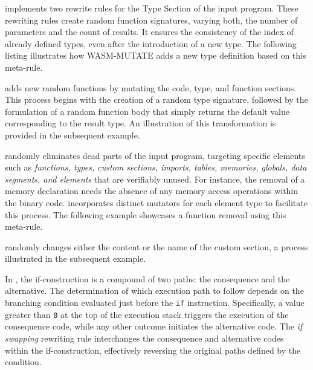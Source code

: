 \tool implements two rewrite rules for the Type Section of the input \Wasm program.
These rewriting rules create random function signatures, varying both, the number of parameters and the count of results. 
It ensures the consistency of the index of already defined types, even after the introduction of a new type.
The following listing illustrates how WASM-MUTATE adds a new type definition based on this meta-rule. 



\tool adds new random functions by mutating the code, type, and function sections. 
This process begins with the creation of a random type signature, followed by the formulation of a random function body that simply returns the default value corresponding to the result type. 
An illustration of this transformation is provided in the subsequent example.



 \tool randomly eliminates dead parts of the input \wasm program, targeting specific elements such as \emph{functions, types, custom sections, imports, tables, memories, globals, data segments, and elements} that are verifiably unused. 
For instance, the removal of a memory declaration needs the absence of any memory access operations within the binary code. 
\tool incorporates distinct mutators for each element type to facilitate this process.
The following example showcases a function removal using this meta-rule.






 \tool randomly changes either the content or the name of the custom section, a process illustrated in the subsequent example.




 In \Wasm, the if-construction is a compound of two paths: the consequence and the alternative. 
The determination of which execution path to follow depends on the branching condition evaluated just before the \texttt{if} instruction. 
Specifically, a value greater than \texttt{0} at the top of the execution stack triggers the execution of the consequence code, while any other outcome initiates the alternative code.
The \emph{if swapping} rewriting rule interchanges the consequence and alternative codes within the if-construction, effectively reversing the original paths defined by the condition.



